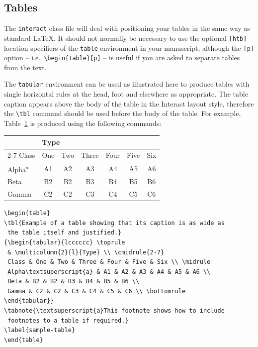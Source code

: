 \documentclass[]{interact}
\theoremstyle{plain}%
\theoremstyle{definition}
\theoremstyle{remark}
\begin{document}
\subsection{Tables}

The \texttt{interact} class file will deal with positioning your tables in the same way as standard \LaTeX. It should not normally be necessary to use the optional \texttt{[htb]} location specifiers of the \texttt{table} environment in your manuscript, although the \texttt{[p]} option -- i.e.\ \verb"\begin{table}[p]" -- is useful if you are asked to separate tables from the text.

The \texttt{tabular} environment can be used as illustrated here to produce tables with single horizontal rules at the head, foot and elsewhere as appropriate.
The table caption appears above the body of the table in the \textsf{Interact} layout style, therefore the \verb"\tbl" command should be used before the body of the table.
For example, Table~\ref{sample-table} is produced using the following commands:
\begin{table}
{\begin{tabular}{lcccccc} \toprule
 & \multicolumn{2}{l}{Type} \\ \cmidrule{2-7}
 Class & One & Two & Three & Four & Five & Six \\ \midrule
 Alpha\textsuperscript{a} & A1 & A2 & A3 & A4 & A5 & A6 \\
 Beta & B2 & B2 & B3 & B4 & B5 & B6 \\
 Gamma & C2 & C2 & C3 & C4 & C5 & C6 \\ \bottomrule
\end{tabular}}
\label{sample-table}
\end{table}
\begin{verbatim}
\begin{table}
\tbl{Example of a table showing that its caption is as wide as
 the table itself and justified.}
{\begin{tabular}{lcccccc} \toprule
 & \multicolumn{2}{l}{Type} \\ \cmidrule{2-7}
 Class & One & Two & Three & Four & Five & Six \\ \midrule
 Alpha\textsuperscript{a} & A1 & A2 & A3 & A4 & A5 & A6 \\
 Beta & B2 & B2 & B3 & B4 & B5 & B6 \\
 Gamma & C2 & C2 & C3 & C4 & C5 & C6 \\ \bottomrule
\end{tabular}}
\tabnote{\textsuperscript{a}This footnote shows how to include
 footnotes to a table if required.}
\label{sample-table}
\end{table}
\end{verbatim}
\end{document}
